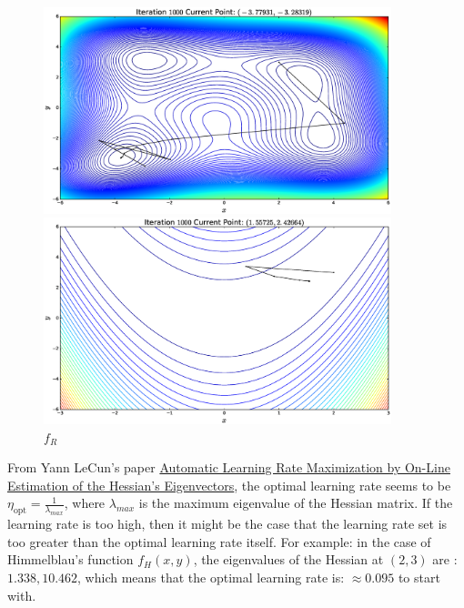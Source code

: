 \documentclass{article}
\begin{document}
\begin{flushleft}
\begin{figure}[H]
\begin{minipage}{0.45\linewidth}
\includegraphics[width=0.9\textwidth]{./images/himmelblau_inv}
\caption{\(f_{H}\)}
\end{minipage}
\hfill
\begin{minipage}{0.45\linewidth}
\includegraphics[width=0.9\textwidth]{./images/rosenbrock_inv}
\caption{\(f_{R}\)}
\end{minipage}
\end{figure}

From Yann LeCun's paper \href{http://yann.lecun.com/exdb/publis/pdf/lecun-simard-pearlmutter-93.pdf}{Automatic Learning Rate Maximization by On-Line Estimation of the Hessian's Eigenvectors}, the optimal learning rate seems to be \(\eta_{\text{opt}} = \frac{1}{\lambda_{max}}\), where \(\lambda_{max}\) is the maximum eigenvalue of the Hessian matrix. If the learning rate is too high, then it might be the case that the learning rate set is too greater than the optimal learning rate itself. For example: in the case of Himmelblau's function \(f_{H}(x, y)\), the eigenvalues of the Hessian at \((2, 3)\) are : \(1.338, 10.462\), which means that the optimal learning rate is: \(\approx 0.095\) to start with.

\end{flushleft}
\end{document}
